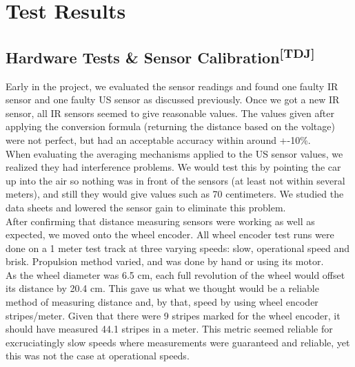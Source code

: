 \chapter{Test Results}
\section[Hardware Tests \& Sensor Calibration]
{Hardware Tests \& Sensor Calibration\textsuperscript{[TDJ]}}
Early in the project, we evaluated the sensor readings and found one faulty IR
sensor and one faulty US sensor as discussed previously. Once we got a new IR
sensor, all IR sensors seemed to give reasonable values. The values given after
applying the conversion formula (returning the distance based on the voltage)
were not perfect, but had an acceptable accuracy within around +-10\%.\\

\noindent
When evaluating the averaging mechanisms applied to the US sensor values, we
realized they had interference problems. We would test this by pointing the car
up into the air so nothing was in front of the sensors (at least not within
several meters), and still they would give values such as 70 centimeters. We
studied the data sheets and lowered the sensor gain to eliminate this problem.\\

\noindent
After confirming that distance measuring sensors were working as well as
expected, we moved onto the wheel encoder. All wheel encoder test runs were done
on a 1 meter test track at three varying speeds: slow, operational speed and
brisk. Propulsion method varied, and was done by hand or using its motor.\\

\noindent
As the wheel diameter was 6.5 cm, each full revolution of the wheel would offset
its distance by 20.4 cm. This gave us what we thought would be a reliable method
of measuring distance and, by that, speed by using wheel encoder stripes/meter.
Given that there were 9 stripes marked for the wheel encoder, it should have
measured 44.1 stripes in a meter. This metric seemed reliable for excruciatingly
slow speeds where measurements were guaranteed and reliable, yet this was not
the case at operational speeds.\\

